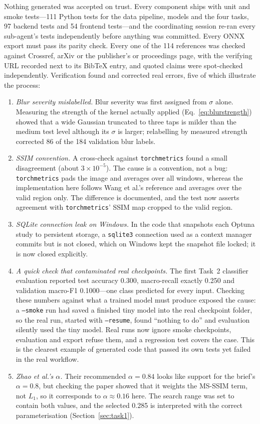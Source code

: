 \documentclass[conference]{IEEEtran}
\begin{document}
Nothing generated was accepted on trust. Every component ships with unit and
smoke tests---111 Python tests for the data pipeline, models and the four tasks,
97 backend tests and 54 frontend tests---and the coordinating session re-ran every
sub-agent's tests independently before anything was committed. Every ONNX export
must pass its parity check. Every one of the 114 references was checked against
Crossref, arXiv or the publisher's or proceedings page, with the verifying URL
recorded next to its BibTeX entry, and quoted claims were spot-checked
independently. Verification found and corrected real errors, five of which
illustrate the process:

\begin{enumerate}
\item \emph{Blur severity mislabelled.} Blur severity was first assigned from
$\sigma$ alone. Measuring the strength of the kernel actually applied
(Eq.~\ref{eq:blurstrength}) showed that a wide Gaussian truncated to three taps is
milder than the medium test level although its $\sigma$ is larger; relabelling by
measured strength corrected 86 of the 184 validation blur labels.
\item \emph{SSIM convention.} A cross-check against \texttt{torchmetrics} found a
small disagreement (about $3\times10^{-5}$). The cause is a convention, not a bug:
\texttt{torchmetrics} pads the image and averages over all windows, whereas the
implementation here follows Wang et al.'s reference and averages over the valid
region only. The difference is documented, and the test now asserts agreement
with \texttt{torchmetrics}' SSIM map cropped to the valid region.
\item \emph{SQLite connection leak on Windows.} In the code that snapshots each
Optuna study to persistent storage, a \texttt{sqlite3} connection used as a
context manager commits but is not closed, which on Windows kept the snapshot file
locked; it is now closed explicitly.
\item \emph{A quick check that contaminated real checkpoints.} The first Task~2
classifier evaluation reported test accuracy 0.300, macro-recall exactly 0.250 and
validation macro-F1 0.1000---one class predicted for every input. Checking these
numbers against what a trained model must produce exposed the cause: a
\texttt{--smoke} run had saved a finished tiny model into the real checkpoint
folder, so the real run, started with \texttt{--resume}, found ``nothing to do'' and
evaluation silently used the tiny model. Real runs now ignore smoke checkpoints,
evaluation and export refuse them, and a regression test covers the case. This is
the clearest example of generated code that passed its own tests yet failed in
the real workflow.
\item \emph{Zhao et al.'s $\alpha$.} Their recommended $\alpha = 0.84$ looks like
support for the brief's $\alpha = 0.8$, but checking the paper showed that it
weights the MS-SSIM term, not $L_1$, so it corresponds to $\alpha \approx 0.16$
here. The search range was set to contain both values, and the selected 0.285 is
interpreted with the correct parameterisation (Section~\ref{sec:task1}).
\end{enumerate}
\end{document}
